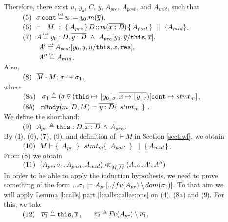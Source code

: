 \begin{description}
\item[{}]
 
 Therefore, there exist $u$, $y_o$, $C$, $\overline y$,  $A_{pre}$, $A_{post}$, and $A_{mid}$, such that \\
 $\SPS (5) \ \ \sigma.\prg{cont}\txteq u:=y_0.m(\overline y)$,\\
$\strut \ \ \hspace{0.5cm} \ \  (6) \  \ {\vdash \ \ M\ \ \mathbf{:}\ \  \{\, A_{pre}\, \}\, D\!::\!m(\overline{x:D})\, \{\, A_{post}\, \} \, \,\parallel\,\, \{ A_{mid} \}}$, \\
$\SPS (7) \  \ A \txteq y_0:D ,\overline {y:D}\ \wedge \  A_{pre}[y_0,\overline y/\prg{this},\overline x],$\\
$\SPSF  A'  \txteq A_{post}[y_0,\overline y, u/\prg{this},\overline x, \prg{res}],$\\ 
$\SPSF  A'' \txteq  A_{mid}$. 
\\
Also, \\
$\strut \ \ \hspace{0.5cm} \ \  (8) \ \ \overline{M}\cdot M;\, {\sigma} \rightsquigarrow \sigma_1$, \\
 where \\
$\strut \ \ \hspace{0.5cm} \ \  (8a) \ \ \ \sigma_1\triangleq ( \sigma \, {\triangledown}\,  (\mbox{\normalfont{\texttt{this}}}\mapsto {\lfloor y_0 \rfloor_{\sigma}},{\overline{x \mapsto {\lfloor y \rfloor_{\sigma}}}}) [\mbox{\normalfont{\texttt{cont}}}\mapsto stmt_m]$, \\ 
$\SPS (8b) \ \ \   \prg{mBody}(m,D,M)=\overline{y:D}\{\    stmt_m\ \}$ .\\
We define the shorthand:\\
$\strut \ \ \hspace{0.5cm} \ \  (9) \ \  A_{pr} \triangleq  \mbox{\normalfont{\texttt{this}}}:D,\overline{x:D}\, \wedge\, A_{pre}$.
\\
By (1), (6), (7), (9),  and definition of $\vdash M$ in Section \ref{sect:wf}, we obtain\\
$\strut \ \ \hspace{0.5cm} \ \  (10) \ \  M \vdash   \{\,  \ A_{pr} \   \, \}\ \ stmt_m  \{\, \ A_{post}\  \, \} \, \,\parallel\,\, \{\, A_{mid} \, \} $.\\
From (8) we obtain\\  
$\strut \ \ \hspace{0.5cm} \ \  (11) \ \ (A_{pr},\sigma_1,A_{post}, A_{mid}) \ll_{M,\overline{M}} (A,\sigma,A', A'')$
\\
In order to be able to apply the induction hypothesis, we need to prove something of the form $... \sigma_1 \models A_{pr}[../fv(A_{pr})\setminus dom(\sigma_1)]$. To that aim we will apply Lemma   \ref{l:calls} part \ref{l:calls:callee:one} on (4), (8a) and (9). For this, we take
\\
$\strut \ \ \hspace{0.5cm} \ \  (12) \ \ \ \overline {v_1} \triangleq \mbox{\normalfont{\texttt{this}}},\overline x$, \ \ \ 
$\overline {v_2} \triangleq  {\hspace{-1pt}F\hspace{-1pt}}v(A_{pr})\setminus \overline {v_1}$, \ \ \ 

\end{description}
